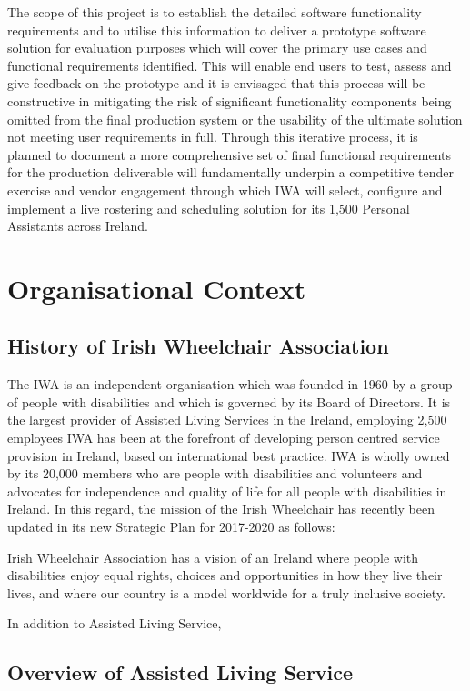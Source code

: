 \documentclass[a4paper,12pt]{article}
\begin{document}
The scope of this project is to establish the detailed software functionality requirements and to utilise this information to deliver a prototype software solution for evaluation purposes which will cover the primary use cases and functional requirements identified. This will enable end users to test, assess and give feedback on the prototype and it is envisaged that this process will be constructive in mitigating the risk of significant functionality components being omitted from the final production system or the usability of the ultimate solution not meeting user requirements in full. Through this iterative process, it is planned to document a more comprehensive set of final functional requirements for the production deliverable will fundamentally underpin a competitive tender exercise and vendor engagement through which IWA will select, configure and implement a live rostering and scheduling solution for its 1,500 Personal Assistants across Ireland.


\section{Organisational Context}
\subsection {History of Irish Wheelchair Association}
The IWA is an independent organisation which was founded in 1960 by a group of people with disabilities and which is governed by its Board of Directors. It is the largest provider of Assisted Living Services in the Ireland, employing 2,500 employees
 IWA has been at the forefront of developing person centred  service provision in Ireland, based on international best practice. IWA is wholly owned by its 20,000 members who are people with disabilities and volunteers and advocates for independence and quality of life for all people with disabilities in Ireland. In this regard, the mission of the Irish Wheelchair has recently been updated in its new Strategic Plan for 2017-2020 as follows:
\begin{displayquote}
Irish Wheelchair Association  has a vision of an Ireland where people with disabilities enjoy equal rights, choices and opportunities in how they live their lives, and where our country is a model worldwide for a truly inclusive society.
\end{displayquote}

In addition to Assisted Living Service,


\subsection {Overview of Assisted Living Service}
\end{document}
